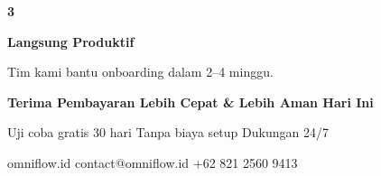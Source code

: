 \documentclass[a4paper]{article}
\begin{document}
\begin{center}
\begin{minipage}[t]{0.318\textwidth}
{\begin{minipage}{\dimexpr\linewidth-2\fboxsep\relax}
            \begin{center}
                {\fontsize{22}{26}\selectfont\bfseries\color{BluePrimary} 3}
            \end{center}
            \vspace{2pt}
            \begin{center}
                {\fontsize{10}{13}\selectfont\bfseries\color{BlueDark} Langsung Produktif}\par\vspace{3pt}
                {\fontsize{9}{12}\selectfont\color{TextDark} Tim kami bantu onboarding dalam 2--4 minggu.}
            \end{center}
            \vspace{6pt}
        \end{minipage}}
\end{minipage}
\end{center}

\vspace{8pt}

{\setlength{\fboxsep}{10pt}\setlength{\fboxrule}{0pt}%
\noindent\colorbox{BluePrimary}{%
    \begin{minipage}{\dimexpr\textwidth-2\fboxsep\relax}
        \centering
        {\fontsize{13}{16}\selectfont\bfseries\color{White}
        Terima Pembayaran Lebih Cepat \& Lebih Aman Hari Ini}\par\vspace{3pt}
        {\fontsize{9.5}{12}\selectfont\color{BlueMid}
        Uji coba gratis 30 hari \enspace\textbullet\enspace Tanpa biaya setup \enspace\textbullet\enspace Dukungan 24/7}\par\vspace{2pt}
        {\fontsize{9.5}{12}\selectfont\color{BlueLight}
        omniflow.id \enspace\textbullet\enspace contact@omniflow.id \enspace\textbullet\enspace +62 821 2560 9413}
    \end{minipage}}}

\restoregeometry
\pagestyle{empty}
\end{document}
